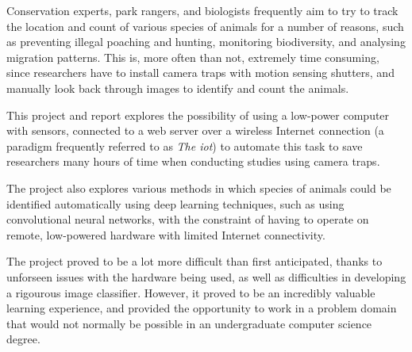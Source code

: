 Conservation experts, park rangers, and biologists frequently aim to try to
track the location and count of various species of animals for a number of
reasons, such as preventing illegal poaching and hunting, monitoring
biodiversity, and analysing migration patterns. This is, more often than not,
extremely time consuming, since researchers have to install camera traps with
motion sensing shutters, and manually look back through images to identify
and count the animals.

This project and report explores the possibility of using a low-power
computer with sensors, connected to a web server over a wireless Internet
connection (a paradigm frequently referred to as \textit{The \acrfull{iot}})
to automate this task to save researchers many hours of time when conducting
studies using camera traps.

The project also explores various methods in which species of animals could
be identified automatically using deep learning techniques, such as using
convolutional neural networks, with the constraint of having to operate on
remote, low-powered hardware with limited Internet connectivity.

The project proved to be a lot more difficult than first anticipated, thanks
to unforseen issues with the hardware being used, as well as difficulties in
developing a rigourous image classifier. However, it proved to be an
incredibly valuable learning experience, and provided the opportunity to work
in a problem domain that would not normally be possible in an undergraduate
computer science degree.